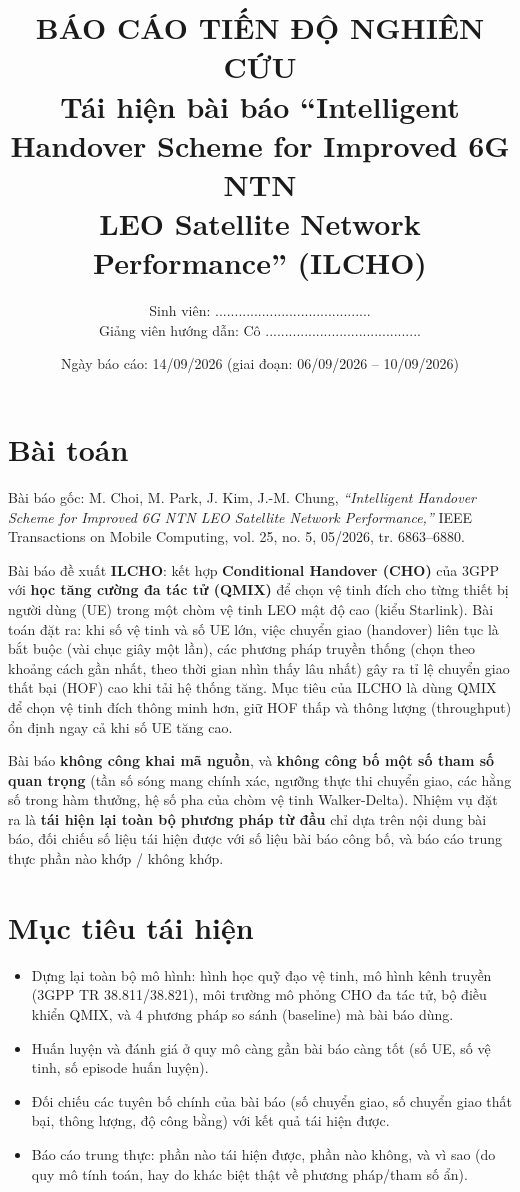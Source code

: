 \documentclass[12pt,a4paper]{article}
\title{\textbf{BÁO CÁO TIẾN ĐỘ NGHIÊN CỨU}\\[4pt]
\large Tái hiện bài báo ``Intelligent Handover Scheme for Improved 6G NTN\\
LEO Satellite Network Performance'' (ILCHO)}
\author{Sinh viên: ........................................\\
Giảng viên hướng dẫn: Cô ........................................}
\date{Ngày báo cáo: 14/09/2026 \quad (giai đoạn: 06/09/2026 -- 10/09/2026)}
\begin{document}
\maketitle

\section{Bài toán}

Bài báo gốc: M. Choi, M. Park, J. Kim, J.-M. Chung, \emph{``Intelligent Handover Scheme for
Improved 6G NTN LEO Satellite Network Performance,''} IEEE Transactions on Mobile Computing,
vol. 25, no. 5, 05/2026, tr. 6863--6880.

Bài báo đề xuất \textbf{ILCHO}: kết hợp \textbf{Conditional Handover (CHO)} của 3GPP với
\textbf{học tăng cường đa tác tử (QMIX)} để chọn vệ tinh đích cho từng thiết bị người dùng
(UE) trong một chòm vệ tinh LEO mật độ cao (kiểu Starlink). Bài toán đặt ra: khi số vệ tinh
và số UE lớn, việc chuyển giao (handover) liên tục là bắt buộc (vài chục giây một lần), các
phương pháp truyền thống (chọn theo khoảng cách gần nhất, theo thời gian nhìn thấy lâu nhất)
gây ra tỉ lệ chuyển giao thất bại (HOF) cao khi tải hệ thống tăng. Mục tiêu của ILCHO là dùng
QMIX để chọn vệ tinh đích thông minh hơn, giữ HOF thấp và thông lượng (throughput) ổn định
ngay cả khi số UE tăng cao.

Bài báo \textbf{không công khai mã nguồn}, và \textbf{không công bố một số tham số quan
trọng} (tần số sóng mang chính xác, ngưỡng thực thi chuyển giao, các hằng số trong hàm
thưởng, hệ số pha của chòm vệ tinh Walker-Delta). Nhiệm vụ đặt ra là \textbf{tái hiện lại
toàn bộ phương pháp từ đầu} chỉ dựa trên nội dung bài báo, đối chiếu số liệu tái hiện được
với số liệu bài báo công bố, và báo cáo trung thực phần nào khớp / không khớp.

\section{Mục tiêu tái hiện}

\begin{itemize}[leftmargin=1.2em]
  \item Dựng lại toàn bộ mô hình: hình học quỹ đạo vệ tinh, mô hình kênh truyền (3GPP TR
        38.811/38.821), môi trường mô phỏng CHO đa tác tử, bộ điều khiển QMIX, và 4 phương
        pháp so sánh (baseline) mà bài báo dùng.
  \item Huấn luyện và đánh giá ở quy mô càng gần bài báo càng tốt (số UE, số vệ tinh, số
        episode huấn luyện).
  \item Đối chiếu các tuyên bố chính của bài báo (số chuyển giao, số chuyển giao thất bại,
        thông lượng, độ công bằng) với kết quả tái hiện được.
  \item Báo cáo trung thực: phần nào tái hiện được, phần nào không, và vì sao (do quy mô tính
        toán, hay do khác biệt thật về phương pháp/tham số ẩn).
\end{itemize}
\end{document}
